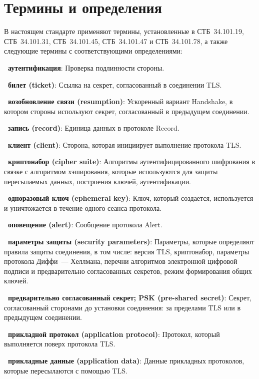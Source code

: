 \chapter{Термины и определения}\label{TERMS}

В настоящем стандарте применяют термины, установленные в СТБ~34.101.19, 
СТБ~34.101.31, СТБ~34.101.45, СТБ~34.101.47 и СТБ~34.101.78, а также следующие 
термины с соответствующими определениями: 

{\bf \thedefctr~аутентификация}:
Проверка подлинности стороны.

{\bf \thedefctr~билет (ticket)}:
Ссылка на секрет, согласованный в соединении TLS.

{\bf \thedefctr~возобновление связи (resumption)}: 
Ускоренный вариант Handshake, в котором стороны используют секрет, 
согласованный в предыдущем соединении. 

{\bf \thedefctr~запись (record)}:
Единица данных в протоколе Record.

{\bf \thedefctr~клиент (client)}:
Сторона, которая инициирует выполнение протокола TLS.


{\bf \thedefctr~криптонабор (cipher suite)}:
Алгоритмы аутентифицированного шифрования в связке с алгоритмом хэширования,
которые используются для защиты пересылаемых данных, построения ключей, 
аутентификации.

{\bf \thedefctr~одноразовый ключ (ephemeral key)}:
Ключ, который создается, используется и уничтожается в течение одного сеанса 
протокола. 


{\bf \thedefctr~оповещение (alert)}:
Сообщение протокола Alert.

{\bf \thedefctr~параметры защиты (security parameters)}:
Параметры, которые определяют правила защиты соединения, в том числе: 
версия TLS, криптонабор, параметры протокола Диффи~--- Хеллмана, перечни 
алгоритмов электронной цифровой подписи и предварительно согласованных 
секретов, режим формирования общих ключей.

{\bf \thedefctr~предварительно согласованный секрет; PSK (pre-shared secret)}:
Секрет, согласованный сторонами до установки соединения: за пределами TLS или в 
предыдущем соединении.

{\bf \thedefctr~прикладной протокол (application protocol)}:
Протокол, который выполняется поверх протокола TLS.

{\bf \thedefctr~прикладные данные (application data)}:
Данные прикладных протоколов, которые пересылаются с помощью TLS.

